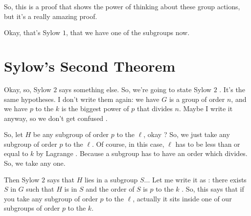 \begin{speech}[00:16:33 - 00:17:03]
 So, this is a proof that shows the power of thinking about these group actions, but it's a really amazing proof.

Okay, that's Sylow $1$, that we have one of the subgroups now. 
\end{speech}

\begin{hidden}
\end{hidden}

\section{Sylow's Second Theorem}

\begin{speech}[00:17:03 - 00:18:39]
Okay, so, Sylow $2$ says something else. So, we're going to state Sylow $2$ . It's the same hypotheses. I don't write them again: we have $G$ is a group of order $n$, and we have $p$ to the $k$ is the biggest power of $p$ that divides $n$. Maybe I write it anyway, so we don't get confused .

So, let $H$ be any subgroup of order $p$ to the $\ell$, okay ? So, we just take any subgroup of order $p$ to the $\ell$. Of course, in this case, $\ell$ has to be less than or equal to $k$ by Lagrange . Because a subgroup has to have an order which divides. So, we take any one.

Then Sylow $2$ says that $H$ lies in a subgroup $S$... Let me write it as : there exists $S$ in $G$ such that $H$ is in $S$ and the order of $S$ is $p$ to the $k$ . So, this says that if you take any subgroup of order $p$ to the $\ell$, actually it sits inside one of our subgroups of order $p$ to the $k$.
\end{speech}

